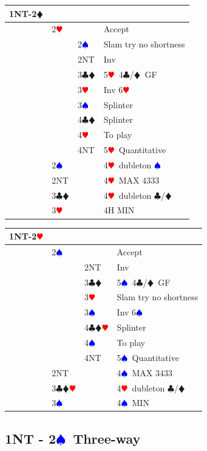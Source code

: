 \documentclass[a4paper]{article}
\newcommand{\BC}{\textcolor{OliveGreen}{$\clubsuit$}}
\newcommand{\BD}{\textcolor{RedOrange}{$\vardiamondsuit$}}
\newcommand{\BH}{\textcolor{Red}{$\varheartsuit${}}}
\newcommand{\BS}{\textcolor{Blue}{$\spadesuit${}}}
\newcommand{\pdfs}{\texorpdfstring{\BS{}}{S}}
\begin{document}
\begingroup
\renewcommand{\arraystretch}{1.4}
\begin{xltabular}{\linewidth}{|l|l|l|X|}
\hline
1NT-2\BD &  &  &  \\
\hline
 & 2\BH &  & Accept \\
\hline
 &  & 2\BS & Slam try no shortness \\
\hline
 &  & 2NT & Inv \\
\hline
 &  & 3\BC\BD & 5\BH\ 4\BC /\BD\ GF \\
\hline
 &  & 3\BH & Inv 6\BH \\
\hline
 &  & 3\BS & Splinter \\
\hline
 &  & 4\BC\BD & Splinter \\
\hline
 &  & 4\BH & To play \\
\hline
 &  & 4NT & 5\BH\ Quantitative \\
\hline
 & 2\BS &  & 4\BH\ dubleton \BS \\
\hline
 & 2NT &  & 4\BH\ MAX 4333 \\
\hline
 & 3\BC\BD &  & 4\BH\ dubleton \BC /\BD \\
\hline
 & 3\BH &  & 4H MIN \\
\hline
\end{xltabular}
\endgroup
\bigbreak
\begingroup
\renewcommand{\arraystretch}{1.4}
\begin{xltabular}{\linewidth}{|l|l|l|X|}
\hline
1NT-2\BH &  &  &  \\
\hline
 & 2\BS &  & Accept \\
\hline
 &  & 2NT & Inv \\
\hline
 &  & 3\BC\BD & 5\BS\ 4\BC /\BD\ GF \\
\hline
 &  & 3\BH & Slam try no shortness \\
\hline
 &  & 3\BS & Inv 6\BS \\
\hline
 &  & 4\BC\BD\BH & Splinter \\
\hline
 &  & 4\BS & To play \\
\hline
 &  & 4NT & 5\BS\ Quantitative \\
\hline
 & 2NT &  & 4\BS\ MAX 3433 \\
\hline
 & 3\BC\BD\BH &  & 4\BH\ dubleton \BC /\BD \\
\hline
 & 3\BS &  & 4\BS\ MIN \\
\hline
\end{xltabular}
\endgroup
\bigbreak
\subsection{1NT - 2\pdfs\ Three-way}
\end{document}
